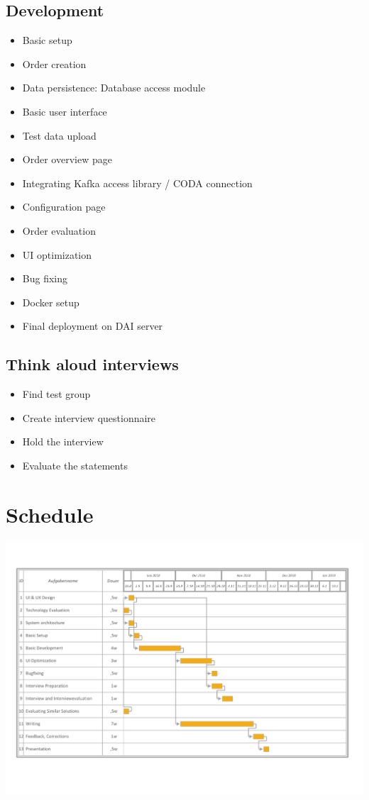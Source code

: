 \documentclass[12pt,a4paper,titlepage,oneside,BCOR1cm]{scrreprt}
\begin{document}
\section{Development}
\begin{itemize}
  \item Basic setup
  \item Order creation
  \item Data persistence: Database access module
  \item Basic user interface
  \item Test data upload
  \item Order overview page
  \item Integrating Kafka access library / CODA connection
  \item Configuration page
  \item Order evaluation
  \item UI optimization  
  \item Bug fixing
  \item Docker setup
  \item Final deployment on DAI server
\end{itemize}
\section{Think aloud interviews}
  \begin{itemize}
    \item Find test group
    \item Create interview questionnaire
    \item Hold the interview
    \item Evaluate the statements
  \end{itemize}

\chapter{Schedule}

\hspace*{-1.5in}
\includegraphics[width=\paperwidth]{gantt-proposal-3.pdf}
\end{document}

